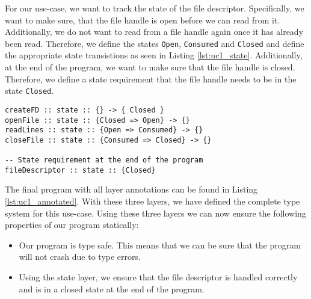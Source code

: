 For our use-case, we want to track the state of the file descriptor. Specifically, we want to make sure, that the file handle is open before we can read from it. Additionally, we do not want to read from a file handle again once it has already been read. Therefore, we define the states \texttt{Open}, \texttt{Consumed} and \texttt{Closed} and define the appropriate state transistions as seen in Listing \ref{lst:uc1_state}. Additionally, at the end of the program, we want to make sure that the file handle is closed. Therefore, we define a state requirement that the file handle needs to be in the state \texttt{Closed}.

\begin{lstlisting}
createFD :: state :: {} -> { Closed }
openFile :: state :: {Closed => Open} -> {}
readLines :: state :: {Open => Consumed} -> {}
closeFile :: state :: {Consumed => Closed} -> {}

-- State requirement at the end of the program
fileDescriptor :: state :: {Closed}
\end{lstlisting}

The final program with all layer annotations can be found in Listing \ref{lst:uc1_annotated}. With these three layers, we have defined the complete type system for this use-case. Using these three layers we can now ensure the following properties of our program statically:

\begin{itemize}
	\item Our program is type safe. This means that we can be sure that the program will not crash due to type errors.
	\item Using the state layer, we ensure that the file descriptor is handled correctly and is in a closed state at the end of the program.
\end{itemize}


